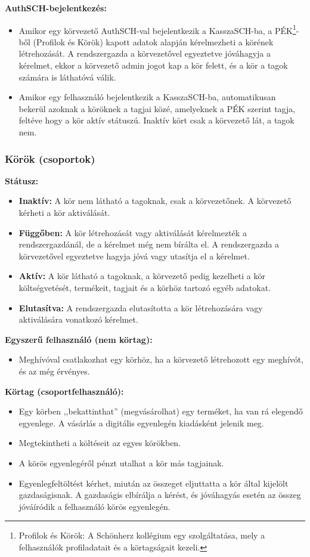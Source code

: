 \noindent\textbf{AuthSCH-bejelentkezés:}
\begin{itemize}
	\item Amikor egy körvezető AuthSCH-val bejelentkezik a KasszaSCH-ba, a PÉK\footnote{Profilok és Körök: A Schönherz kollégium egy szolgáltatása, mely a felhasználók profiladatait és a körtagságait kezeli.}-ből (Profilok és Körök) kapott adatok alapján kérelmezheti a körének létrehozását. A rendszergazda a körvezetővel egyeztetve jóváhagyja a kérelmet, ekkor a körvezető admin jogot kap a kör felett, és a kör a tagok számára is láthatóvá válik.
	\item Amikor egy felhasználó bejelentkezik a KasszaSCH-ba, automatikusan bekerül azoknak a köröknek a tagjai közé, amelyeknek a PÉK szerint tagja, feltéve hogy a kör aktív státuszú. Inaktív kört csak a körvezető lát, a tagok nem.
\end{itemize}

\subsubsection{Körök (csoportok)}

\noindent\textbf{Státusz:}
\begin{itemize}
	\item \textbf{Inaktív:} A kör nem látható a tagoknak, csak a körvezetőnek. A körvezető kérheti a kör aktiválását.
	\item \textbf{Függőben:} A kör létrehozását vagy aktiválását kérelmezték a rendszergazdánál, de a kérelmet még nem bírálta el. A rendszergazda a körvezetővel egyeztetve hagyja jóvá vagy utasítja el a kérelmet.
	\item \textbf{Aktív:} A kör látható a tagoknak, a körvezető pedig kezelheti a kör költségvetését, termékeit, tagjait és a körhöz tartozó egyéb adatokat.
	\item \textbf{Elutasítva:} A rendszergazda elutasította a kör létrehozására vagy aktiválására vonatkozó kérelmet.
\end{itemize}

\noindent\textbf{Egyszerű felhasználó (nem körtag):}
\begin{itemize}
	\item Meghívóval csatlakozhat egy körhöz, ha a körvezető létrehozott egy meghívót, és az még érvényes.
\end{itemize}

\noindent\textbf{Körtag (csoportfelhasználó):}
\begin{itemize}
	\item Egy körben ,,bekattinthat'' (megvásárolhat) egy terméket, ha van rá elegendő egyenlege. A vásárlás a digitális egyenlegén kiadásként jelenik meg.
	\item Megtekintheti a költéseit az egyes körökben.
	\item A körös egyenlegéről pénzt utalhat a kör más tagjainak.
	\item Egyenlegfeltöltést kérhet, miután az összeget eljuttatta a kör által kijelölt gazdaságisnak. A gazdaságis elbírálja a kérést, és jóváhagyás esetén az összeg jóváíródik a felhasználó körös egyenlegén.
\end{itemize}

